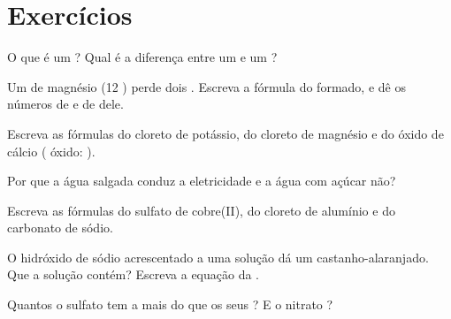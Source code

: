 \section{Exercícios}

\begin{exercise}[$\star$]\label{exo:g9:ions:1}
O que é um ? Qual é a diferença entre um  e um ?
\end{exercise}

\begin{exercise}[$\star$]\label{exo:g9:ions:2}
Um  de magnésio (12 ) perde dois . Escreva a fórmula
do  formado, e dê os números de  e de  dele.
\end{exercise}

\begin{exercise}[$\star$]\label{exo:g9:ions:3}
Escreva as fórmulas do cloreto de potássio, do cloreto de magnésio e do
óxido de cálcio ( óxido: ).
\end{exercise}

\begin{exercise}[$\star$]\label{exo:g9:ions:4}
Por que a água salgada conduz a eletricidade e a água com açúcar não?
\end{exercise}

\begin{exercise}[$\star\star$]\label{exo:g9:ions:5}
Escreva as fórmulas do sulfato de cobre(II), do cloreto de alumínio e do
carbonato de sódio.
\end{exercise}

\begin{exercise}[$\star\star$]\label{exo:g9:ions:6}
O hidróxido de sódio acrescentado a uma solução dá um 
castanho-alaranjado. Que  a solução contém? Escreva a equação da
.
\end{exercise}

\begin{exercise}[$\star\star$]\label{exo:g9:ions:7}
Quantos  o  sulfato  tem a mais do que os seus
? E o  nitrato ?
\end{exercise}


